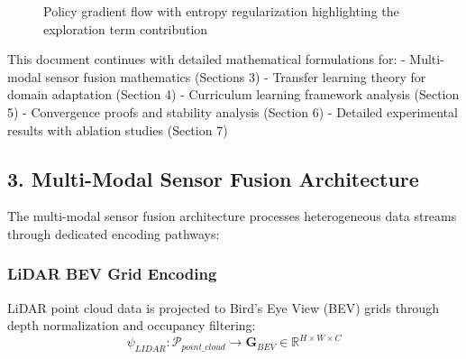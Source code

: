 \documentclass[10pt,a4paper,twocolumn]{article}
\begin{document}
\begin{figure}[h]
    \centering
    \caption{Policy gradient flow with entropy regularization highlighting the exploration term contribution}
    \label{fig:policy_gradient_flow}
\end{figure}


This document continues with detailed mathematical formulations for:
- Multi-modal sensor fusion mathematics (Sections 3)
- Transfer learning theory for domain adaptation (Section 4)
- Curriculum learning framework analysis (Section 5)
- Convergence proofs and stability analysis (Section 6)
- Detailed experimental results with ablation studies (Section 7)

\vfill

\subsection*{3. Multi-Modal Sensor Fusion Architecture}

The multi-modal sensor fusion architecture processes heterogeneous data streams through dedicated encoding pathways:

\subsubsection*{LiDAR BEV Grid Encoding}

LiDAR point cloud data is projected to Bird's Eye View (BEV) grids through depth normalization and occupancy filtering:
\begin{equation}
    \psi_{LIDAR}: \mathcal{P}_{point\_cloud} \rightarrow \mathbf{G}_{BEV} \in \mathbb{R}^{H\times W\times C}
\end{equation}
\end{document}

